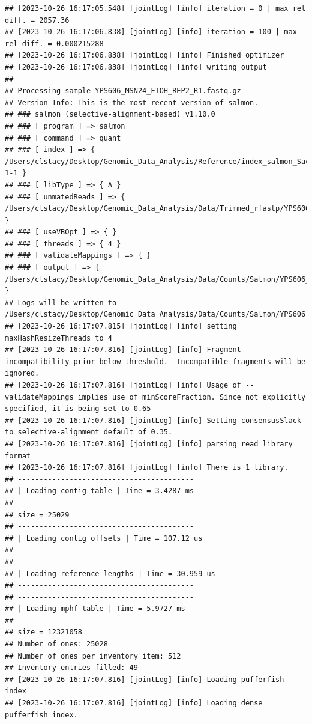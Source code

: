 \documentclass[
]{book}
\begin{document}
\begin{verbatim}
## [2023-10-26 16:17:05.548] [jointLog] [info] iteration = 0 | max rel diff. = 2057.36
## [2023-10-26 16:17:06.838] [jointLog] [info] iteration = 100 | max rel diff. = 0.000215288
## [2023-10-26 16:17:06.838] [jointLog] [info] Finished optimizer
## [2023-10-26 16:17:06.838] [jointLog] [info] writing output 
## 
## Processing sample YPS606_MSN24_ETOH_REP2_R1.fastq.gz
## Version Info: This is the most recent version of salmon.
## ### salmon (selective-alignment-based) v1.10.0
## ### [ program ] => salmon 
## ### [ command ] => quant 
## ### [ index ] => { /Users/clstacy/Desktop/Genomic_Data_Analysis/Reference/index_salmon_Saccharomyces_cerevisiae.R64-1-1 }
## ### [ libType ] => { A }
## ### [ unmatedReads ] => { /Users/clstacy/Desktop/Genomic_Data_Analysis/Data/Trimmed_rfastp/YPS606_MSN24_ETOH_REP2_R1.fastq.gz }
## ### [ useVBOpt ] => { }
## ### [ threads ] => { 4 }
## ### [ validateMappings ] => { }
## ### [ output ] => { /Users/clstacy/Desktop/Genomic_Data_Analysis/Data/Counts/Salmon/YPS606_MSN24_ETOH_REP2_R1.fastq.gz_quant }
## Logs will be written to /Users/clstacy/Desktop/Genomic_Data_Analysis/Data/Counts/Salmon/YPS606_MSN24_ETOH_REP2_R1.fastq.gz_quant/logs
## [2023-10-26 16:17:07.815] [jointLog] [info] setting maxHashResizeThreads to 4
## [2023-10-26 16:17:07.816] [jointLog] [info] Fragment incompatibility prior below threshold.  Incompatible fragments will be ignored.
## [2023-10-26 16:17:07.816] [jointLog] [info] Usage of --validateMappings implies use of minScoreFraction. Since not explicitly specified, it is being set to 0.65
## [2023-10-26 16:17:07.816] [jointLog] [info] Setting consensusSlack to selective-alignment default of 0.35.
## [2023-10-26 16:17:07.816] [jointLog] [info] parsing read library format
## [2023-10-26 16:17:07.816] [jointLog] [info] There is 1 library.
## -----------------------------------------
## | Loading contig table | Time = 3.4287 ms
## -----------------------------------------
## size = 25029
## -----------------------------------------
## | Loading contig offsets | Time = 107.12 us
## -----------------------------------------
## -----------------------------------------
## | Loading reference lengths | Time = 30.959 us
## -----------------------------------------
## -----------------------------------------
## | Loading mphf table | Time = 5.9727 ms
## -----------------------------------------
## size = 12321058
## Number of ones: 25028
## Number of ones per inventory item: 512
## Inventory entries filled: 49
## [2023-10-26 16:17:07.816] [jointLog] [info] Loading pufferfish index
## [2023-10-26 16:17:07.816] [jointLog] [info] Loading dense pufferfish index.

\end{verbatim}
\end{document}

